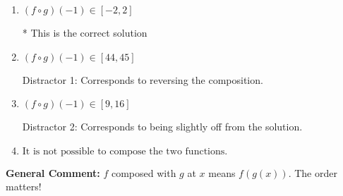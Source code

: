 \documentclass{extbook}[14pt]
\begin{document}
\begin{enumerate}
{\begin{enumerate}[label=\Alph*.]
 Distractor 3: Corresponds to being slightly off from the solution.
\item \( (f \circ g)(-1) \in [-2, 2] \)

* This is the correct solution
\item \( (f \circ g)(-1) \in [44, 45] \)

 Distractor 1: Corresponds to reversing the composition.
\item \( (f \circ g)(-1) \in [9, 16] \)

 Distractor 2: Corresponds to being slightly off from the solution.
\item \( \text{It is not possible to compose the two functions.} \)


\end{enumerate}

\textbf{General Comment:} $f$ composed with $g$ at $x$ means $f(g(x))$. The order matters!
}
\end{enumerate}
\end{document}
